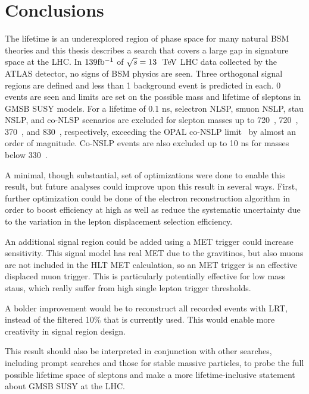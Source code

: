 \chapter{Conclusions}
\label{chap:conclusions}

The lifetime is an underexplored region of phase space for many natural \ac{BSM} theories and this thesis describes a search that covers a large gap in signature space at the \ac{LHC}. In $139 \mbox{fb\(^{-1}\)}$ of $\sqrt{s} = 13~\TeV$ \ac{LHC} data collected by the \ac{ATLAS} detector, no signs of \ac{BSM} physics are seen. Three orthogonal signal regions are defined and less than 1 background event is predicted in each. 0 events are seen and limits are set on the possible mass and lifetime of sleptons in \ac{GMSB} \ac{SUSY} models. For a lifetime of 0.1 ns, selectron NLSP, smuon NSLP, stau NSLP, and co-NLSP scenarios are excluded for slepton masses up to 720~\GeV, 720~\GeV, 370~\GeV, and 830~\GeV, respectively, exceeding the OPAL co-NSLP limit~\cite{Abbiendi:2005gc} by almost an order of magnitude. Co-NSLP events are also excluded up to 10 ns for masses below 330~\GeV.

A minimal, though substantial, set of optimizations were done to enable this result, but future analyses could improve upon this result in several ways. First, further optimization could be done of the electron reconstruction algorithm in order to boost efficiency at high \absdz as well as reduce the systematic uncertainty due to the variation in the lepton displacement selection efficiency. 

An additional signal region could be added using a \ac{MET} trigger could increase sensitivity. This signal model has real \ac{MET} due to the gravitinos, but also muons are not included in the \ac{HLT} \ac{MET} calculation, so an \ac{MET} trigger is an effective displaced muon trigger. This is particularly potentially effective for low mass staus, which really suffer from high single lepton trigger \pt thresholds. 

A bolder improvement would be to reconstruct all recorded events with \ac{LRT}, instead of the filtered 10\% that is currently used. This would enable more creativity in signal region design.

This result should also be interpreted in conjunction with other searches, including prompt searches and those for stable massive particles, to probe the full possible lifetime space of sleptons and make a more lifetime-inclusive statement about \ac{GMSB} \ac{SUSY} at the \ac{LHC}. 

